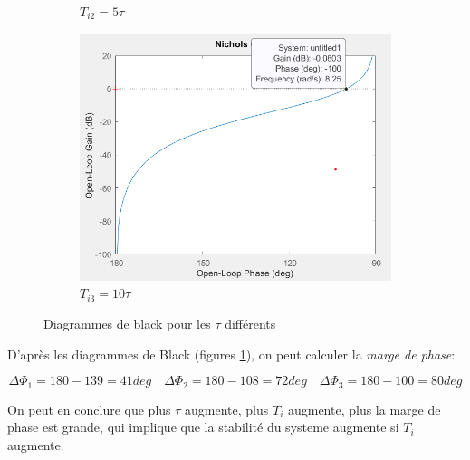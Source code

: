 \documentclass[12pt, a4paper]{report}
\begin{document}
\begin{figure}[H]
\begin{subfigure}[h!]{0.46\linewidth}
        \caption{$T_{i2} = 5\tau$}
    \end{subfigure}    
    \hfill
    \begin{subfigure}[h!]{0.46\linewidth}
        \includegraphics[width=\linewidth]{diagrammblacks1tau10.png}
        \caption{$T_{i3} = 10\tau$}
    \end{subfigure}
    \caption{Diagrammes de black pour les $\tau$ différents}
    \label{fig:diagrammblacks}
\end{figure}

D'après les diagrammes de Black (figures \ref{fig:diagrammblacks}), on peut calculer la \textit{marge de phase}:

\[
    \Delta \Phi_1 = 180 - 139 = 41 deg \quad  \Delta \Phi_2 = 180 - 108 = 72 deg \quad \Delta \Phi_3 = 180 - 100 = 80 deg 
\]

On peut en conclure que plus $\tau$ augmente, plus $T_i$ augmente, plus la marge de phase est grande,
qui implique que la stabilité du systeme augmente si $T_i$ augmente.
\end{document}
